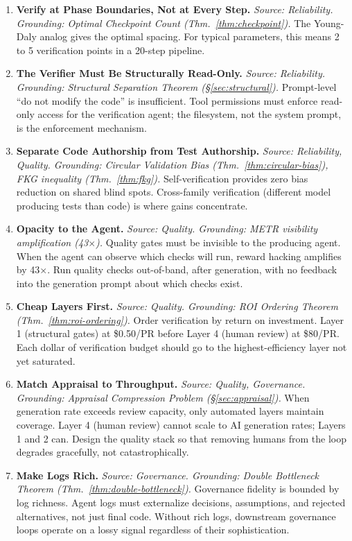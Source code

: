 \begin{enumerate}[label=\textbf{P\arabic*.}, leftmargin=3em]
\item \textbf{Verify at Phase Boundaries, Not at Every Step.}
\emph{Source: Reliability. Grounding: Optimal Checkpoint Count (Thm.~\ref{thm:checkpoint}).}
The Young-Daly analog gives the optimal spacing. For typical parameters, this means 2 to 5 verification points in a 20-step pipeline.

\item \textbf{The Verifier Must Be Structurally Read-Only.}
\emph{Source: Reliability. Grounding: Structural Separation Theorem (\S\ref{sec:structural}).}
Prompt-level ``do not modify the code'' is insufficient. Tool permissions must enforce read-only access for the verification agent; the filesystem, not the system prompt, is the enforcement mechanism.

\item \textbf{Separate Code Authorship from Test Authorship.}
\emph{Source: Reliability, Quality. Grounding: Circular Validation Bias (Thm.~\ref{thm:circular-bias}), FKG inequality (Thm.~\ref{thm:fkg}).}
Self-verification provides zero bias reduction on shared blind spots. Cross-family verification (different model producing tests than code) is where gains concentrate.

\item \textbf{Opacity to the Agent.}
\emph{Source: Quality. Grounding: METR visibility amplification (43$\times$).}
Quality gates must be invisible to the producing agent. When the agent can observe which checks will run, reward hacking amplifies by 43$\times$. Run quality checks out-of-band, after generation, with no feedback into the generation prompt about which checks exist.

\item \textbf{Cheap Layers First.}
\emph{Source: Quality. Grounding: ROI Ordering Theorem (Thm.~\ref{thm:roi-ordering}).}
Order verification by return on investment. Layer 1 (structural gates) at \$0.50/PR before Layer 4 (human review) at \$80/PR. Each dollar of verification budget should go to the highest-efficiency layer not yet saturated.

\item \textbf{Match Appraisal to Throughput.}
\emph{Source: Quality, Governance. Grounding: Appraisal Compression Problem (\S\ref{sec:appraisal}).}
When generation rate exceeds review capacity, only automated layers maintain coverage. Layer 4 (human review) cannot scale to AI generation rates; Layers 1 and 2 can. Design the quality stack so that removing humans from the loop degrades gracefully, not catastrophically.

\item \textbf{Make Logs Rich.}
\emph{Source: Governance. Grounding: Double Bottleneck Theorem (Thm.~\ref{thm:double-bottleneck}).}
Governance fidelity is bounded by log richness. Agent logs must externalize decisions, assumptions, and rejected alternatives, not just final code. Without rich logs, downstream governance loops operate on a lossy signal regardless of their sophistication.

\end{enumerate}

